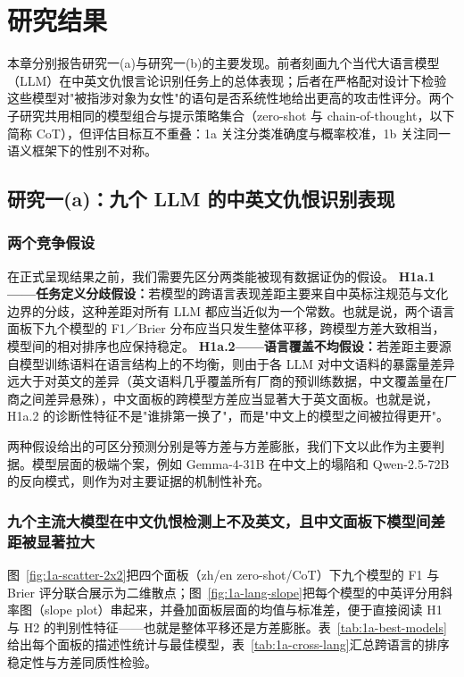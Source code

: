 \documentclass[UTF8,12pt]{ctexart}
\begin{document}

\section{研究结果}
\label{sec:results}

本章分别报告研究一(a)与研究一(b)的主要发现。前者刻画九个当代大语言模型（LLM）在中英文仇恨言论识别任务上的总体表现；后者在严格配对设计下检验这些模型对"被指涉对象为女性"的语句是否系统性地给出更高的攻击性评分。两个子研究共用相同的模型组合与提示策略集合（zero-shot 与 chain-of-thought，以下简称 CoT），但评估目标互不重叠：1a 关注分类准确度与概率校准，1b 关注同一语义框架下的性别不对称。

\subsection{研究一(a)：九个 LLM 的中英文仇恨识别表现}
\label{subsec:results-1a}

\subsubsection{两个竞争假设}
\label{subsubsec:1a-hypotheses}

在正式呈现结果之前，我们需要先区分两类能被现有数据证伪的假设。
\textbf{H1a.1——任务定义分歧假设：}若模型的跨语言表现差距主要来自中英标注规范与文化边界的分歧，这种差距对所有 LLM 都应当近似为一个常数。也就是说，两个语言面板下九个模型的 F1／Brier 分布应当只发生整体平移，跨模型方差大致相当，模型间的相对排序也应保持稳定。
\textbf{H1a.2——语言覆盖不均假设：}若差距主要源自模型训练语料在语言结构上的不均衡，则由于各 LLM 对中文语料的暴露量差异远大于对英文的差异（英文语料几乎覆盖所有厂商的预训练数据，中文覆盖量在厂商之间差异悬殊），中文面板的跨模型方差应当显著大于英文面板。也就是说，H1a.2 的诊断性特征不是"谁排第一换了"，而是"中文上的模型之间被拉得更开"。

两种假设给出的可区分预测分别是等方差与方差膨胀，我们下文以此作为主要判据。模型层面的极端个案，例如 Gemma-4-31B 在中文上的塌陷和 Qwen-2.5-72B 的反向模式，则作为对主要证据的机制性补充。

\subsubsection{九个主流大模型在中文仇恨检测上不及英文，且中文面板下模型间差距被显著拉大}
\label{subsubsec:1a-cross-language}

图~\ref{fig:1a-scatter-2x2}把四个面板（zh/en \texttimes{} zero-shot/CoT）下九个模型的 F1 与 Brier 评分联合展示为二维散点；图~\ref{fig:1a-lang-slope}把每个模型的中英评分用斜率图（slope plot）串起来，并叠加面板层面的均值与标准差，便于直接阅读 H1 与 H2 的判别性特征——也就是整体平移还是方差膨胀。表~\ref{tab:1a-best-models}给出每个面板的描述性统计与最佳模型，表~\ref{tab:1a-cross-lang}汇总跨语言的排序稳定性与方差同质性检验。
\end{document}
